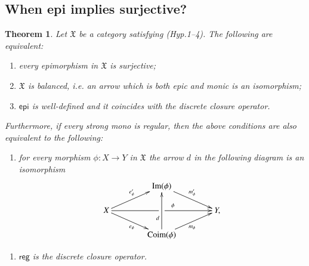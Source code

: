 \documentclass[12pt]{article}
\newtheorem{theorem}[lemma]{Theorem}
\theoremstyle{definition}
\def\X{\mathfrak X}
\def\Coim{\mathrm{Coim}}
\def\Im{\mathrm{Im}}
\numberwithin{equation}{section}
\def\epi{\mathsf{epi}}
\begin{document}
\subsection{When epi implies surjective?} 
\begin{theorem}
Let $\X$ be a category satisfying (Hyp.1--4). The following are equivalent:
	\begin{enumerate}[\rm (1)]
		\item every epimorphism in $\X$ is surjective;
		\item $\X$ is \emph{balanced}, i.e. an arrow which is both epic and monic is an isomorphism;
		\item $\epi$ is well-defined and it coincides with the discrete closure operator.
	\end{enumerate}
Furthermore, if every strong mono is regular, then the above conditions are also equivalent to the following:
	\begin{enumerate}[\rm (4)]
		\item for every morphism $\phi\colon X\rightarrow Y$ in $\X$ the arrow $d$ in the following diagram is an isomorphism
			\[
		\xymatrix@C=40pt@R=15pt{
			& \Im(\phi) \ar[dr]^{m'_\phi}  &  \\ 
			X \ar[ru]^{e'_\phi} \ar[rr]|-{\ \ \ }^(0.6){\phi}\ar[dr]_{e_\phi}&  & Y,\\
			& \Coim(\phi) \ar[ur]_{m_\phi} \ar[uu]^(0.35){d}&
		}
		\]
\end{enumerate}
\noindent 
\begin{enumerate}[\rm(5)]
	\item  $\mathsf{reg}$ is the discrete closure operator.
\end{enumerate}
\end{theorem} 
\end{document}
